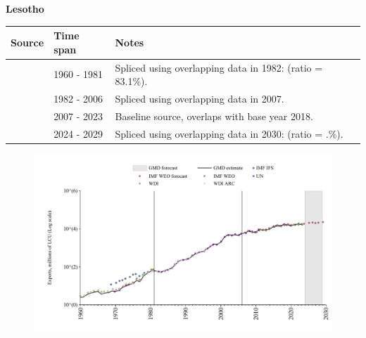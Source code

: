 \documentclass[12pt,a4paper,landscape]{article}
\begin{document}
\begin{adjustbox}{max totalsize={\paperwidth}{\paperheight},center}
\begin{minipage}[t][\textheight][t]{\textwidth}
\vspace*{0.5cm}
{}
\begin{center}
{\Large\bfseries Lesotho}
\end{center}
\vspace{0.5cm}
\begin{table}[H]
\centering
\small
\begin{tabular}{|l|l|l|}
\hline
\textbf{Source} & \textbf{Time span} & \textbf{Notes} \\
\hline
\rowcolor{white}\cite{WDI}& 1960 - 1981 &Spliced using overlapping data in 1982: (ratio = 83.1\%).\\
\rowcolor{lightgray}\cite{UN}& 1982 - 2006 &Spliced using overlapping data in 2007.\\
\rowcolor{white}\cite{WDI}& 2007 - 2023 &Baseline source, overlaps with base year 2018.\\
\rowcolor{lightgray}\cite{IMF_WEO_forecast}& 2024 - 2029 &Spliced using overlapping data in 2030: (ratio = .\%).\\
\hline
\end{tabular}
\end{table}
\begin{figure}[H]
\centering
\includegraphics[width=\textwidth,height=0.6\textheight,keepaspectratio]{graphs/LSO_exports.pdf}
\end{figure}
\end{minipage}
\end{adjustbox}
\end{document}
